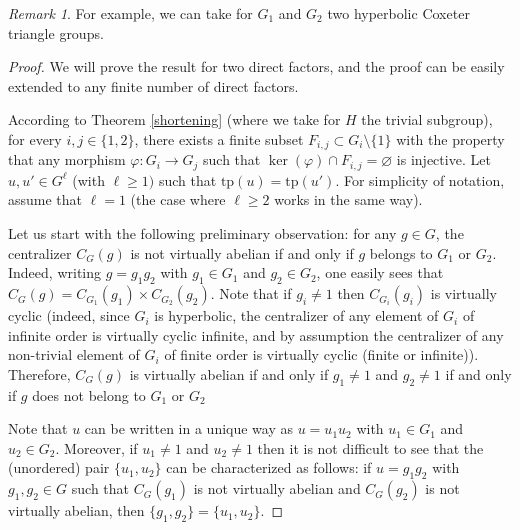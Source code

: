 \documentclass[a4paper, 11pt]{amsart}
\theoremstyle{definition}
\theoremstyle{remark}
\newtheorem{rk}[te]{Remark}
\renewcommand{\geq}{\geqslant}
\begin{document}
\begin{rk}
For example, we can take for $G_1$ and $G_2$ two hyperbolic Coxeter triangle groups. 
\end{rk}

\begin{proof}We will prove the result for two direct factors, and the proof can be easily extended to any finite number of direct factors.

\smallskip \noindent
According to Theorem \ref{shortening} (where we take for $H$ the trivial subgroup), for every $i,j\in\lbrace 1,2\rbrace$, there exists a finite subset $F_{i,j}\subset G_i\setminus \lbrace 1\rbrace$ with the property that any morphism $\varphi : G_i\rightarrow G_j$ such that $\ker(\varphi)\cap F_{i,j}=\varnothing$ is injective. Let $u,u'\in G^{\ell}$ (with $\ell\geq 1)$ such that $\mathrm{tp}(u)=\mathrm{tp}(u')$. For simplicity of notation, assume that $\ell=1$ (the case where $\ell\geq 2$ works in the same way). 

\smallskip \noindent
Let us start with the following preliminary observation: for any $g\in G$, the centralizer $C_G(g)$ is not virtually abelian if and only if $g$ belongs to $G_1$ or $G_2$. Indeed, writing $g=g_1g_2$ with $g_1\in G_1$ and $g_2\in G_2$, one easily sees that $C_G(g)=C_{G_1}(g_1)\times C_{G_2}(g_2)$. Note that if $g_i\neq 1$ then $C_{G_i}(g_i)$ is virtually cyclic (indeed, since $G_i$ is hyperbolic, the centralizer of any element of $G_i$ of infinite order is virtually cyclic infinite, and by assumption the centralizer of any non-trivial element of $G_i$ of finite order is virtually cyclic (finite or infinite)). Therefore, $C_G(g)$ is virtually abelian if and only if $g_1\neq 1$ and $g_2\neq 1$ if and only if $g$ does not belong to $G_1$ or $G_2$

\smallskip \noindent
Note that $u$ can be written in a unique way as $u=u_1u_2$ with $u_1\in G_1$ and $u_2\in G_2$. Moreover, if $u_1\neq 1$ and $u_2\neq 1$ then it is not difficult to see that the (unordered) pair $\lbrace u_1,u_2\rbrace$ can be characterized as follows: if $u=g_1g_2$ with $g_1,g_2\in G$ such that $C_G(g_1)$ is not virtually abelian and $C_G(g_2)$ is not virtually abelian, then $\lbrace g_1,g_2\rbrace=\lbrace u_{1},u_{2}\rbrace$. %


\end{proof}
\end{document}
